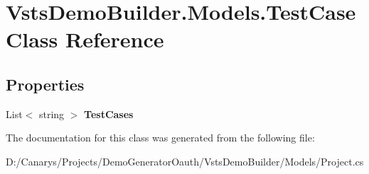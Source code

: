 \hypertarget{class_vsts_demo_builder_1_1_models_1_1_test_case}{}\section{Vsts\+Demo\+Builder.\+Models.\+Test\+Case Class Reference}
\label{class_vsts_demo_builder_1_1_models_1_1_test_case}
\subsection*{Properties}
\begin{DoxyCompactItemize}
\item 
\mbox{\label{class_vsts_demo_builder_1_1_models_1_1_test_case_a0ed63b167633e704c3a80350322a7021}} 
List$<$ string $>$ {\bfseries Test\+Cases}
\end{DoxyCompactItemize}


The documentation for this class was generated from the following file\+:\begin{DoxyCompactItemize}
\item 
D\+:/\+Canarys/\+Projects/\+Demo\+Generator\+Oauth/\+Vsts\+Demo\+Builder/\+Models/Project.\+cs\end{DoxyCompactItemize}
